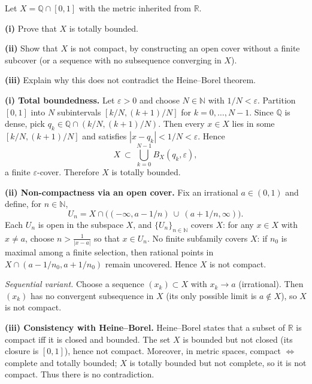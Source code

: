 \begin{problem}[CP-IV-0073]
\label{prob:cp-iv-0073}
Let $X=\mathbb{Q}\cap[0,1]$ with the metric inherited from $\mathbb R$.
\par\smallskip\noindent\textbf{(i)} Prove that $X$ is totally bounded.
\par\smallskip\noindent\textbf{(ii)} Show that $X$ is not compact, by constructing an open cover without a finite subcover (or a sequence with no subsequence converging in $X$).
\par\smallskip\noindent\textbf{(iii)} Explain why this does not contradict the Heine--Borel theorem.
\end{problem}

\begin{solution}
\par\medskip\noindent\textbf{(i) Total boundedness.}\quad 
Let $\varepsilon>0$ and choose $N\in\mathbb{N}$ with $1/N<\varepsilon$. Partition $[0,1]$ into $N$ subintervals
$[k/N,(k+1)/N]$ for $k=0,\dots,N-1$. Since $\mathbb{Q}$ is dense, pick $q_k\in\mathbb{Q}\cap(k/N,(k+1)/N)$.
Then every $x\in X$ lies in some $[k/N,(k+1)/N]$ and satisfies $|x-q_k|<1/N<\varepsilon$. Hence
\[
X\ \subset\ \bigcup_{k=0}^{N-1} B_X(q_k,\varepsilon),
\]
a finite $\varepsilon$-cover. Therefore $X$ is totally bounded.

\par\medskip\noindent\textbf{(ii) Non-compactness via an open cover.}\quad 
Fix an irrational $a\in(0,1)$ and define, for $n\in\mathbb{N}$,
\[
U_n = X \cap\Big( (-\infty,a-1/n)\ \cup\ (a+1/n,\infty)\Big).
\]
Each $U_n$ is open in the subspace $X$, and $\{U_n\}_{n\in\mathbb{N}}$ covers $X$:
for any $x\in X$ with $x\ne a$, choose $n>\frac1{|x-a|}$ so that $x\in U_n$.
No finite subfamily covers $X$: if $n_0$ is maximal among a finite selection, then rational points in
$X\cap(a-1/n_0,a+1/n_0)$ remain uncovered. Hence $X$ is not compact.

\emph{Sequential variant.} Choose a sequence $(x_k)\subset X$ with $x_k\to a$ (irrational).
Then $(x_k)$ has no convergent subsequence in $X$ (its only possible limit is $a\notin X$), so $X$ is not compact.

\par\medskip\noindent\textbf{(iii) Consistency with Heine--Borel.}\quad 
Heine--Borel states that a subset of $\mathbb{R}$ is compact iff it is closed and bounded.
The set $X$ is bounded but not closed (its closure is $[0,1]$), hence not compact. Moreover, in metric spaces,
compact $\iff$ complete and totally bounded; $X$ is totally bounded but not complete, so it is not compact.
Thus there is no contradiction.
\end{solution}

